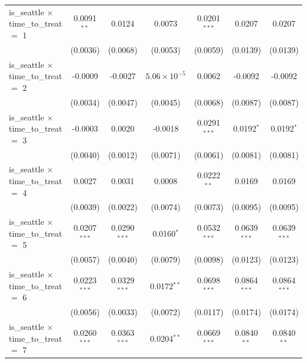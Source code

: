 \documentclass[A4paper,12pt]{article}
\begin{document}
\begin{appendices}
\begin{table}[ht]
{\begin{tabular}{lcccccc}
   is\_seattle $\times$ time\_to\_treat $=$ 1      & 0.0091$^{**}$  & 0.0124          & 0.0073                & 0.0201$^{***}$  & 0.0207          & 0.0207\\   
                                                   & (0.0036)       & (0.0068)        & (0.0053)              & (0.0059)        & (0.0139)        & (0.0139)\\   
   is\_seattle $\times$ time\_to\_treat $=$ 2      & -0.0009        & -0.0027         & $5.06\times 10^{-5}$  & 0.0062          & -0.0092         & -0.0092\\   
                                                   & (0.0034)       & (0.0047)        & (0.0045)              & (0.0068)        & (0.0087)        & (0.0087)\\   
   is\_seattle $\times$ time\_to\_treat $=$ 3      & -0.0003        & 0.0020          & -0.0018               & 0.0291$^{***}$  & 0.0192$^{*}$    & 0.0192$^{*}$\\   
                                                   & (0.0040)       & (0.0012)        & (0.0071)              & (0.0061)        & (0.0081)        & (0.0081)\\   
   is\_seattle $\times$ time\_to\_treat $=$ 4      & 0.0027         & 0.0031          & 0.0008                & 0.0222$^{**}$   & 0.0169          & 0.0169\\   
                                                   & (0.0039)       & (0.0022)        & (0.0074)              & (0.0073)        & (0.0095)        & (0.0095)\\   
   is\_seattle $\times$ time\_to\_treat $=$ 5      & 0.0207$^{***}$ & 0.0290$^{***}$  & 0.0160$^{*}$          & 0.0532$^{***}$  & 0.0639$^{***}$  & 0.0639$^{***}$\\   
                                                   & (0.0057)       & (0.0040)        & (0.0079)              & (0.0098)        & (0.0123)        & (0.0123)\\   
   is\_seattle $\times$ time\_to\_treat $=$ 6      & 0.0223$^{***}$ & 0.0329$^{***}$  & 0.0172$^{**}$         & 0.0698$^{***}$  & 0.0864$^{***}$  & 0.0864$^{***}$\\   
                                                   & (0.0056)       & (0.0033)        & (0.0072)              & (0.0117)        & (0.0174)        & (0.0174)\\   
   is\_seattle $\times$ time\_to\_treat $=$ 7      & 0.0260$^{***}$ & 0.0363$^{***}$  & 0.0204$^{**}$         & 0.0669$^{***}$  & 0.0840$^{**}$   & 0.0840$^{**}$\\   

\end{tabular}}
\end{table}
\end{appendices}
\end{document}
